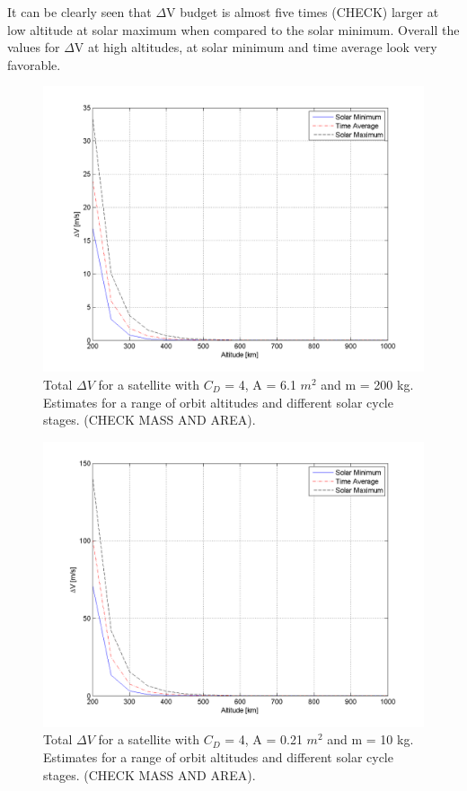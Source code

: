 It can be clearly seen that $\Delta$V budget is almost five times (CHECK) larger at low altitude at solar maximum when compared to the solar minimum. Overall the values for $\Delta$V at high altitudes, at solar minimum and time average look very favorable. 

\begin{figure}[h!]
\centering
\includegraphics[width=0.95\textheight, angle=90]{chapters/img/deltaVEmitter.png}
\caption{Total $\Delta V$ for a satellite with $C_D$ = 4, A = 6.1 $m^2$ and m = 200 kg. Estimates for a range of orbit altitudes and different solar cycle stages. (CHECK MASS AND AREA).}
\label{fig:deltaVGraph1}
\end{figure}

\begin{figure}[h!]
\centering
\includegraphics[width=0.95\textheight, angle=90]{chapters/img/deltaVReceiver.png}
\caption{Total $\Delta V$ for a satellite with $C_D$ = 4, A = 0.21 $m^2$ and m = 10 kg. Estimates for a range of orbit altitudes and different solar cycle stages. (CHECK MASS AND AREA).}
\label{fig:deltaVGraph2}
\end{figure}   

